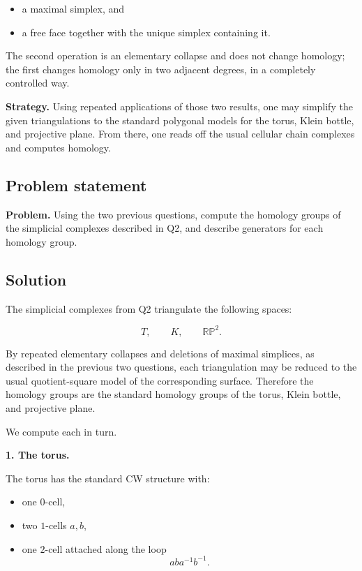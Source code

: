 \documentclass[12pt,a4paper]{article}
\theoremstyle{notespace}
\begin{document}
\begin{itemize}
	\item a maximal simplex, and
	\item a free face together with the unique simplex containing it.
\end{itemize}

The second operation is an elementary collapse and does not change homology; the first changes homology only in two adjacent degrees, in a completely controlled way.

\medskip

\textbf{Strategy.}
Using repeated applications of those two results, one may simplify the given triangulations to the standard polygonal models for the torus, Klein bottle, and projective plane. From there, one reads off the usual cellular chain complexes and computes homology.

\subsection{Problem statement}

\textbf{Problem.}
Using the two previous questions, compute the homology groups of the simplicial complexes described in Q2, and describe generators for each homology group.

\subsection{Solution}

The simplicial complexes from Q2 triangulate the following spaces:

\[
T,\qquad K,\qquad \mathbb{RP}^2.
\]

By repeated elementary collapses and deletions of maximal simplices, as described in the previous two questions, each triangulation may be reduced to the usual quotient-square model of the corresponding surface. Therefore the homology groups are the standard homology groups of the torus, Klein bottle, and projective plane.

We compute each in turn.

\bigskip

\textbf{1. The torus.}

The torus has the standard CW structure with:

\begin{itemize}
	\item one \(0\)-cell,
	\item two \(1\)-cells \(a,b\),
	\item one \(2\)-cell attached along the loop
	\[
	aba^{-1}b^{-1}.
	\]
\end{itemize}
\end{document}
